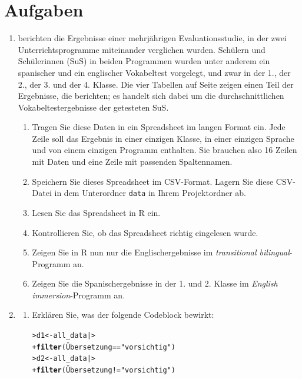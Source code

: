 \documentclass[oneside, 10pt]{book}\usepackage[]{graphicx}\usepackage[]{xcolor}
\makeatletter
\newcommand{\hlstr}[1]{\textcolor[rgb]{0.192,0.494,0.8}{#1}}%
\newcommand{\hlopt}[1]{\textcolor[rgb]{0,0,0}{#1}}%
\newcommand{\hlstd}[1]{\textcolor[rgb]{0.345,0.345,0.345}{#1}}%
\newcommand{\hlkwb}[1]{\textcolor[rgb]{0.69,0.353,0.396}{#1}}%
\newcommand{\hlkwd}[1]{\textcolor[rgb]{0.737,0.353,0.396}{\textbf{#1}}}%
\newenvironment{kframe}{%
 \def\at@end@of@kframe{}%
 \ifinner\ifhmode%
  \def\at@end@of@kframe{\end{minipage}}%
  \begin{minipage}{\columnwidth}%
 \fi\fi%
 \def\FrameCommand##1{\hskip\@totalleftmargin \hskip-\fboxsep
 \colorbox{shadecolor}{##1}\hskip-\fboxsep
     \hskip-\linewidth \hskip-\@totalleftmargin \hskip\columnwidth}%
 \MakeFramed {\advance\hsize-\width
   \@totalleftmargin\z@ \linewidth\hsize
   \@setminipage}}%
 {\par\unskip\endMakeFramed%
 \at@end@of@kframe}
\newenvironment{knitrout}{}{} %
\makeatother
\begin{document}
\section{Aufgaben}
\begin{enumerate}
  \item \citet{Slavin2011} berichten die Ergebnisse einer mehrjährigen Evaluationsstudie,
in der zwei Unterrichtsprogramme miteinander verglichen wurden.
Schülern und Schülerinnen (SuS) in beiden Programmen wurden unter anderem
ein spanischer und ein englischer Vokabeltest vorgelegt, und zwar
in der 1., der 2., der 3. und der 4. Klasse. Die vier Tabellen auf 
Seite \pageref{tab:slavin_1} zeigen einen Teil der Ergebnisse, die \citet{Slavin2011} berichten; es handelt sich
dabei um die durchschnittlichen Vokabeltestergebnisse der getesteten SuS.

\begin{enumerate}
\item Tragen Sie diese Daten in ein Spread\-sheet im 
langen Format ein. Jede Zeile soll das Ergebnis in einer einzigen 
Klasse, in einer einzigen Sprache und von einem einzigen Programm 
enthalten. Sie brauchen also 16 Zeilen mit Daten und eine Zeile 
mit passenden Spaltennamen.

\item Speichern Sie dieses Spread\-sheet im CSV-Format.
Lagern Sie diese CSV-Datei in dem Unterordner
\texttt{data} in Ihrem Projektordner ab.

\item Lesen Sie das Spread\-sheet in R ein.

\item Kontrollieren Sie, ob das Spread\-sheet richtig eingelesen wurde.

\item Zeigen Sie in R nun nur die Englischergebnisse im \textit{transitional bilingual}-Programm an.

\item Zeigen Sie die Spanischergebnisse in der 1. und 2. Klasse im \textit{English immersion}-Programm an.
\end{enumerate}

  \item 
  \begin{enumerate}
  \item Erklären Sie, was der folgende Codeblock bewirkt:
\begin{knitrout}
\color{fgcolor}\begin{kframe}
\begin{alltt}
\hlstd{> }\hlstd{d1} \hlkwb{<-} \hlstd{all_data |>}
\hlstd{+ }  \hlkwd{filter}\hlstd{(Übersetzung} \hlopt{==} \hlstr{"vorsichtig"}\hlstd{)}
\hlstd{> }\hlstd{d2} \hlkwb{<-} \hlstd{all_data |>}
\hlstd{+ }  \hlkwd{filter}\hlstd{(Übersetzung} \hlopt{!=} \hlstr{"vorsichtig"}\hlstd{)}
\end{alltt}
\end{kframe}
\end{knitrout}


\end{enumerate}
\end{enumerate}
\end{document}
